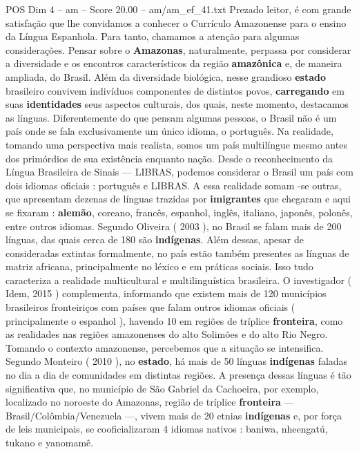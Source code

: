 \begin{textsample}{POS Dim 4 – am – Score 20.00 – am/am\_ef\_41.txt}  \label{ex:f4_pos_101}
Prezado leitor, é com grande satisfação que lhe convidamos a conhecer o Currículo Amazonense para o ensino da Língua Espanhola.
Para tanto, chamamos a atenção para algumas considerações.
Pensar sobre o \textbf{Amazonas}, naturalmente, perpassa por considerar a diversidade e os encontros característicos da região \textbf{amazônica} e, de maneira ampliada, do Brasil.
Além da diversidade biológica, nesse grandioso \textbf{estado} brasileiro convivem indivíduos componentes de distintos povos, \textbf{carregando} em suas \textbf{identidades} seus aspectos culturais, dos quais, neste momento, destacamos as línguas.
Diferentemente do que pensam algumas pessoas, o Brasil não é um país onde se fala exclusivamente um único idioma, o português.
Na realidade, tomando uma perspectiva mais realista, somos um país multilíngue mesmo antes dos primórdios de sua existência enquanto nação.
Desde o reconhecimento da Língua Brasileira de Sinais — LIBRAS, podemos considerar o Brasil um país com dois idiomas oficiais : português e LIBRAS.
A essa realidade somam -se outras, que apresentam dezenas de línguas trazidas por \textbf{imigrantes} que chegaram e aqui se fixaram : \textbf{alemão}, coreano, francês, espanhol, inglês, italiano, japonês, polonês, entre outros idiomas.
Segundo Oliveira ( 2003 ), no Brasil se falam mais de 200 línguas, das quais cerca de 180 são \textbf{indígenas}.
Além dessas, apesar de consideradas extintas formalmente, no país estão também presentes as línguas de matriz africana, principalmente no léxico e em práticas sociais.
Isso tudo caracteriza a realidade multicultural e multilinguística brasileira.
O investigador ( Idem, 2015 ) complementa, informando que existem mais de 120 municípios brasileiros fronteiriços com países que falam outros idiomas oficiais ( principalmente o espanhol ), havendo 10 em regiões de tríplice \textbf{fronteira}, como as realidades nas regiões amazonenses do alto Solimões e do alto Rio Negro.
Tomando o contexto amazonense, percebemos que a situação se intensifica.
Segundo Monteiro ( 2010 ), no \textbf{estado}, há mais de 50 línguas \textbf{indígenas} faladas no dia a dia de comunidades em distintas regiões.
A presença dessas línguas é tão significativa que, no município de São Gabriel da Cachoeira, por exemplo, localizado no noroeste do Amazonas, região de tríplice \textbf{fronteira} — Brasil/Colômbia/Venezuela —, vivem mais de 20 etnias \textbf{indígenas} e, por força de leis municipais, se cooficializaram 4 idiomas nativos : baniwa, nheengatú, tukano e yanomamê.

\end{textsample}
